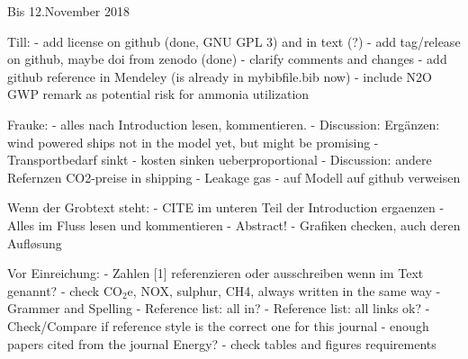 Bis 12.November 2018

Till:
- add license on github (done, GNU GPL 3) and in text (?)
- add tag/release on github, maybe doi from zenodo (done)
- clarify comments and changes
- add github reference in Mendeley (is already in mybibfile.bib now)
- include N2O GWP remark as potential risk for ammonia utilization

Frauke:
- alles nach Introduction lesen, kommentieren.
- Discussion: Ergänzen: wind powered ships not in the model yet, but might be promising
- Transportbedarf sinkt - kosten sinken ueberproportional
- Discussion: andere Refernzen CO2-preise in shipping
- Leakage gas
- auf Modell auf github verweisen

Wenn der Grobtext steht:
- CITE im unteren Teil der Introduction ergaenzen
- Alles im Fluss lesen und kommentieren
- Abstract!
- Grafiken checken, auch deren Aufløsung



Vor Einreichung:
- Zahlen [1] referenzieren oder ausschreiben wenn im Text genannt?
- check CO$_2$e, NOX, sulphur, CH4, always written in the same way
- Grammer and Spelling
- Reference list: all in?
- Reference list: all links ok?
- Check/Compare if reference style is the correct one for this journal
- enough papers cited from the journal Energy?
- check tables and figures requirements

